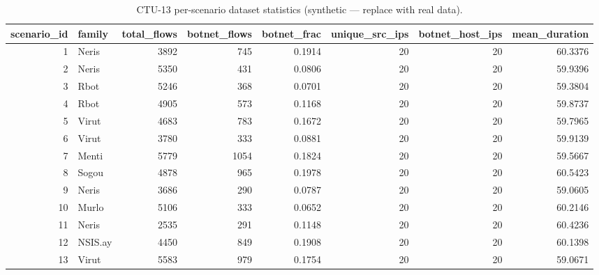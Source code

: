 \begin{table}
\caption{CTU-13 per-scenario dataset statistics (synthetic — replace with real data).}
\label{tab:dataset_stats}
\begin{tabular}{rlrrrrrr}
\toprule
scenario_id & family & total_flows & botnet_flows & botnet_frac & unique_src_ips & botnet_host_ips & mean_duration \\
\midrule
1 & Neris & 3892 & 745 & 0.1914 & 20 & 20 & 60.3376 \\
2 & Neris & 5350 & 431 & 0.0806 & 20 & 20 & 59.9396 \\
3 & Rbot & 5246 & 368 & 0.0701 & 20 & 20 & 59.3804 \\
4 & Rbot & 4905 & 573 & 0.1168 & 20 & 20 & 59.8737 \\
5 & Virut & 4683 & 783 & 0.1672 & 20 & 20 & 59.7965 \\
6 & Virut & 3780 & 333 & 0.0881 & 20 & 20 & 59.9139 \\
7 & Menti & 5779 & 1054 & 0.1824 & 20 & 20 & 59.5667 \\
8 & Sogou & 4878 & 965 & 0.1978 & 20 & 20 & 60.5423 \\
9 & Neris & 3686 & 290 & 0.0787 & 20 & 20 & 59.0605 \\
10 & Murlo & 5106 & 333 & 0.0652 & 20 & 20 & 60.2146 \\
11 & Neris & 2535 & 291 & 0.1148 & 20 & 20 & 60.4236 \\
12 & NSIS.ay & 4450 & 849 & 0.1908 & 20 & 20 & 60.1398 \\
13 & Virut & 5583 & 979 & 0.1754 & 20 & 20 & 59.0671 \\
\bottomrule
\end{tabular}
\end{table}
